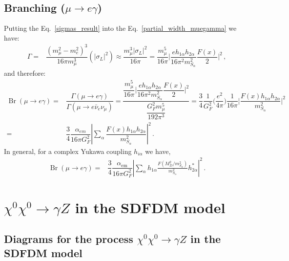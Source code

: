\subsection{ Branching ($\mu \rightarrow e \gamma$)}
Putting the Eq.~\eqref{sigmas_result} into the Eq.~\eqref{partial_width_muegamma} we have:
\begin{align}
\Gamma =&\dfrac{(m_{\mu}^2-m_e^2)^3}{16\pi m_{\mu}^3}(|\sigma_L|^2) \approx \dfrac{m_{\mu}^3 |\sigma_L|^2}{16\pi}
= \dfrac{m_{\mu}^5}{16\pi}\bigg| \dfrac{e h_{1\alpha}h_{2\alpha}}{16 \pi^2 m_{S_\alpha}^2} \dfrac{F(x)}{2} \bigg|^2\,,
\end{align}
and therefore:
\begin{align}
\operatorname{Br}(\mu \rightarrow e \gamma) 
=& \dfrac{\Gamma(\mu \rightarrow e \gamma )}{\Gamma(\mu \rightarrow e \bar{\nu}_e \nu_{\mu})}
=\dfrac{\dfrac{m_{\mu}^5}{16\pi}\bigg| \dfrac{e h_{1\alpha}h_{2\alpha}}{16 \pi^2 m_{S_\alpha}^2} \dfrac{F(x)}{2} \bigg|^2}{ \dfrac{G_F^2 m_{\mu}^5}{192\pi^3} }
=\dfrac{3}{4}\dfrac{1}{G_F^2}\bigg(\dfrac{e^2}{4\pi}\bigg)\dfrac{1}{16\pi}\bigg|\dfrac{F(x)h_{1\alpha}h_{2\alpha}}{m_{S_\alpha}^2}\bigg|^2 \nonumber \\
=&\dfrac{3}{4}\dfrac{\alpha_{em}}{16 \pi G_F^2}\left|\sum_{\alpha}\dfrac{F(x)h_{1\alpha}h_{2\alpha}}{m_{S_\alpha}^2}  \right|^2 \,.
\end{align}
%
In general, for a complex Yukawa coupling $h_{i\alpha}$ we have,
\begin{align}
\operatorname{Br}(\mu \rightarrow e \gamma)=&\dfrac{3}{4}\dfrac{\alpha_{\text{em}}}{16 \pi G_F^2}\left|\sum_{\alpha}
h_{1\alpha}\frac{F\left(M_D^2/m_{S_{\alpha}}^2  \right) }{m_{S_\alpha}^2}h_{2\alpha}^{*}  \right|^2 \,.
\end{align}





\newpage

\section{$\chi^0\chi^0\to\gamma Z$  in the SDFDM model}
\label{sec:xxtogz}

\subsection{Diagrams for the process $\chi^0\chi^0\to\gamma Z$  in the SDFDM model}
\label{sec:xx-to-gz-diagrams}


